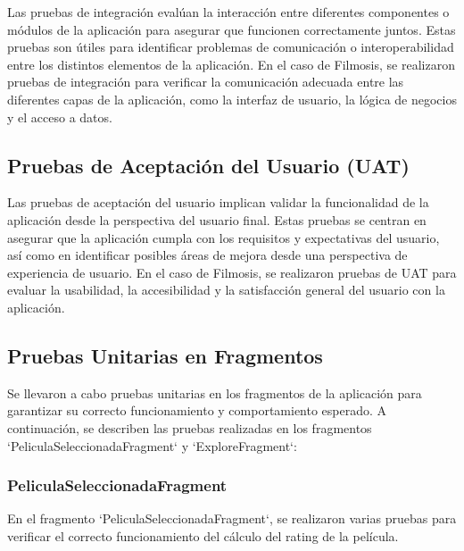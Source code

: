 \documentclass{article}
\begin{document}
Las pruebas de integración evalúan la interacción entre diferentes componentes o módulos de la aplicación para asegurar que funcionen correctamente juntos. Estas pruebas son útiles para identificar problemas de comunicación o interoperabilidad entre los distintos elementos de la aplicación. En el caso de Filmosis, se realizaron pruebas de integración para verificar la comunicación adecuada entre las diferentes capas de la aplicación, como la interfaz de usuario, la lógica de negocios y el acceso a datos.

\subsection{Pruebas de Aceptación del Usuario (UAT)}

Las pruebas de aceptación del usuario implican validar la funcionalidad de la aplicación desde la perspectiva del usuario final. Estas pruebas se centran en asegurar que la aplicación cumpla con los requisitos y expectativas del usuario, así como en identificar posibles áreas de mejora desde una perspectiva de experiencia de usuario. En el caso de Filmosis, se realizaron pruebas de UAT para evaluar la usabilidad, la accesibilidad y la satisfacción general del usuario con la aplicación.

\subsection{Pruebas Unitarias en Fragmentos}

Se llevaron a cabo pruebas unitarias en los fragmentos de la aplicación para garantizar su correcto funcionamiento y comportamiento esperado. A continuación, se describen las pruebas realizadas en los fragmentos `PeliculaSeleccionadaFragment` y `ExploreFragment`:

\subsubsection{PeliculaSeleccionadaFragment}

En el fragmento `PeliculaSeleccionadaFragment`, se realizaron varias pruebas para verificar el correcto funcionamiento del cálculo del rating de la película.
\end{document}
